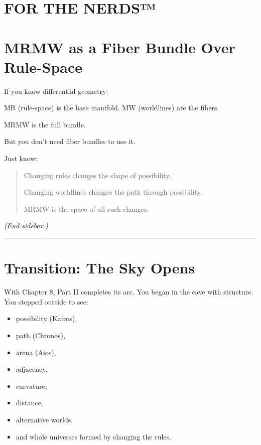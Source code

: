 \section{\texorpdfstring{\textbf{FOR THE
NERDS™}}{FOR THE NERDS™}}

\section{\texorpdfstring{\textbf{MRMW as a Fiber Bundle Over
Rule-Space}}{MRMW as a Fiber Bundle Over Rule-Space}}\label{mrmw-as-a-fiber-bundle-over-rule-space}

If you know differential geometry:

MR (rule-space) is the base manifold. MW (worldlines) are the fibers.

MRMW is the full bundle.

But you don't need fiber bundles to use it.

Just know:

\begin{quote}
Changing rules changes the shape of possibility.

Changing worldlines changes the path through possibility.

MRMW is the space of all such changes.
\end{quote}

\emph{(End sidebar.)}

\begin{center}\rule{0.5\linewidth}{0.5pt}\end{center}

\section{\texorpdfstring{\textbf{Transition: The Sky
Opens}}{8.6 --- Transition: The Sky Opens}}\label{transition-the-sky-opens}

With Chapter 8, Part II completes its arc. You began in the cave with
structure. You stepped outside to see:

\begin{itemize}
\tightlist
\item
  possibility (Kairos),
\item
  path (Chronos),
\item
  arena (Aios),
\item
  adjacency,
\item
  curvature,
\item
  distance,
\item
  alternative worlds,
\item
  and whole universes formed by changing the rules.
\end{itemize}

